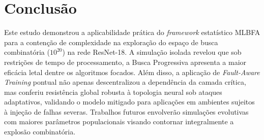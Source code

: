 \documentclass[11pt, a4paper]{article}
\begin{document}
\section{Conclusão}
Este estudo demonstrou a aplicabilidade prática do \textit{framework} estatístico MLBFA para a contenção de complexidade na exploração do espaço de busca combinatória ($10^{20}$) na rede ResNet-18. A simulação isolada revelou que sob restrições de tempo de processamento, a Busca Progressiva apresenta a maior eficácia letal dentre os algoritmos focados. Além disso, a aplicação de \textit{Fault-Aware Training} pontual não apenas descentralizou a dependência da camada crítica, mas conferiu resistência global robusta à topologia neural sob ataques adaptativos, validando o modelo mitigado para aplicações em ambientes sujeitos à injeção de falhas severas. Trabalhos futuros envolverão simulações evolutivas com maiores parâmetros populacionais visando contornar integralmente a explosão combinatória.
\end{document}
